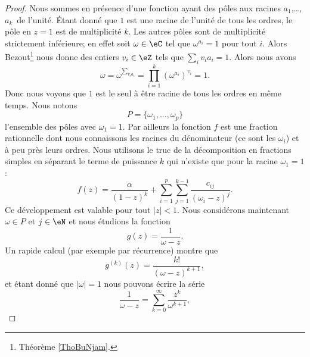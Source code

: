\begin{proof}
    Nous sommes en présence d'une fonction ayant des pôles aux racines \( a_1\),\ldots, \( a_k\)\ieme\ de l'unité. Étant donné que \( 1\) est une racine de l'unité de tous les ordres, le pôle en \( z=1\) est de multiplicité \( k\). Les autres pôles sont de multiplicité strictement inférieure; en effet soit \( \omega\in \eC\) tel que \( \omega^{a_i}=1\) pour tout \( i\). Alors Bezout\footnote{Théorème \ref{ThoBuNjam}.} nous donne des entiers \( v_i\in \eZ\) tels que \( \sum_iv_ia_i=1\). Alors nous avons
    \begin{equation}
        \omega=\omega^{\sum_{v_ia_i}}=\prod_{i=1}^k(\omega^{a_i})^{v_i}=1.
    \end{equation}
    Donc nous voyons que \( 1\) est le seul à être racine de tous les ordres en même temps. Nous notons
    \begin{equation}
        P=\{ \omega_1,\ldots, \omega_p \}
    \end{equation}
    l'ensemble des pôles avec \( \omega_1=1\). Par ailleurs la fonction \( f\) est une fraction rationnelle dont nous connaissons les racines du dénominateur (ce sont les \( \omega_i\)) et à peu près leurs ordres. Nous utilisons le truc de la décomposition en fractions simples
    en séparant le terme de puissance \( k\) qui n'existe que pour la racine \( \omega_1=1\) :
    \begin{equation}    \label{EqDLTJaYr}
        f(z)=\frac{ \alpha }{ (1-z)^k }+\sum_{i=1}^p\sum_{j=1}^{k-1}\frac{ c_{ij} }{ (\omega_i-z)^j }.
    \end{equation}
    Ce développement est valable pour tout \( | z |<1\). Nous considérons maintenant \( \omega\in P\) et \( j\in \eN\) et nous étudions la fonction
    \begin{equation}
        g(z)=\frac{1}{ \omega-z }.
    \end{equation}
    Un rapide calcul (par exemple par récurrence) montre que
    \begin{equation}    \label{EqEJLDIFJ}
        g^{(k)}(z)=\frac{ k! }{ (\omega-z)^{k+1} },
    \end{equation}
    et étant donné que \( | \omega |=1\) nous pouvons écrire la série
    \begin{equation}
        \frac{1}{ \omega-z }=\sum_{k=0}^{\infty}\frac{ z^k }{ \omega^{k+1} },

\end{equation}
\end{proof}

